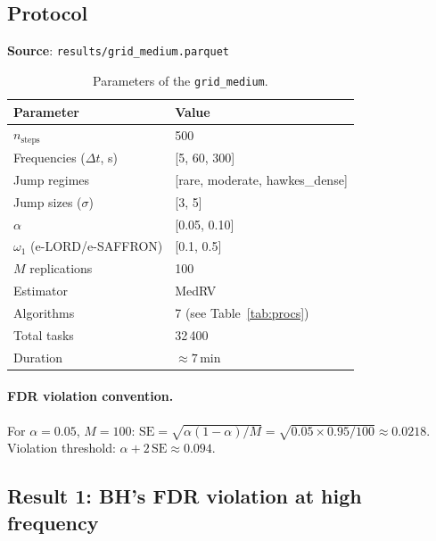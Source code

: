 \documentclass[11pt,a4paper,twocolumn]{article}
\theoremstyle{plain}
\theoremstyle{definition}
\theoremstyle{remark}
\begin{document}
\subsection{Protocol}

\textbf{Source}: \texttt{results/grid\_medium.parquet} 

\begin{table}[t]
\centering
\caption{Parameters of the \texttt{grid\_medium}.}
\label{tab:grid}
\begin{tabular}{ll}
\toprule
Parameter & Value \\
\midrule
$n_\text{steps}$ & 500 \\
Frequencies ($\Delta t$, s) & [5, 60, 300] \\
Jump regimes & [rare, moderate, hawkes\_dense] \\
Jump sizes ($\sigma$) & [3, 5] \\
$\alpha$ & [0.05, 0.10] \\
$\omega_1$ (e-LORD/e-SAFFRON) & [0.1, 0.5] \\
$M$ replications & 100 \\
Estimator & MedRV \\
Algorithms & 7 (see Table~\ref{tab:procs}) \\
Total tasks & 32\,400 \\
Duration & $\approx 7\,\mathrm{min}$ \\
\bottomrule
\end{tabular}
\end{table}

\paragraph{FDR violation convention.}
For $\alpha = 0.05$, $M = 100$:
$\mathrm{SE} = \sqrt{\alpha(1-\alpha)/M} = \sqrt{0.05 \times 0.95/100} \approx 0.0218$.
Violation threshold: $\alpha + 2\,\mathrm{SE} \approx 0.094$.

\subsection{Result 1: BH's FDR violation at high frequency}
\end{document}
